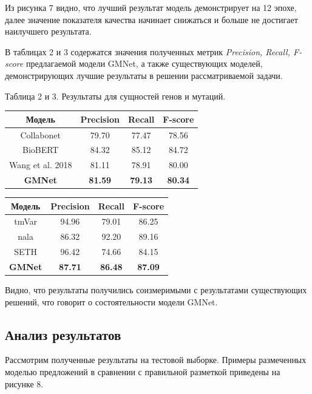 \documentclass[12pt, a4paper]{article} %
\begin{document}
Из рисунка 7 видно, что лучший результат модель демонстрирует на 12 эпохе, далее значение показателя качества начинает снижаться и больше не достигает наилучшего результата.

В таблицах 2 и 3 содержатся значения полученных метрик \textit{Precision, Recall, F-score} предлагаемой модели GMNet, а также существующих моделей, демонстрирующих лучшие результаты в решении рассматриваемой задачи.
 


\begin{center}
	\begin{table}[h]
		\centering
		Таблица 2 и 3. Результаты для сущностей генов и мутаций.
		\begin{tabular}{cccc}
			\hline Модель & Precision &  Recall & F-score \\
			\hline Collabonet & 79.70 & 77.47 & 78.56 \\
			BioBERT & 84.32 & 85.12 & 84.72 \\
			Wang et al. 2018 & 81.11 & 78.91 & 80.00 \\
			\hline
			\textbf{GMNet}&   \textbf{81.59}&   \textbf{79.13} & \textbf{80.34}   \\
			\hline 
		\end{tabular}
		\label{Tab:1}
	\end{table}
	
	\begin{table}[h]
		\centering
		\begin{tabular}{cccc}
			\hline Модель & Precision &  Recall & F-score \\
			\hline tmVar & 94.96 & 79.01 & 86.25 \\
			nala & 86.32 & 92.20 & 89.16 \\
			SETH & 96.42 & 74.66 & 84.15 \\
			\hline
			\textbf{GMNet} & \textbf{87.71}& \textbf{86.48} & \textbf{87.09}   \\
			\hline 
		\end{tabular}
		\label{Tab:3}
	\end{table}
\end{center}

Видно, что результаты получились соизмеримыми с результатами существующих решений, что говорит о состоятельности модели GMNet.

\subsection{Анализ результатов}
Рассмотрим полученные результаты на тестовой выборке. Примеры размеченных моделью предложений в сравнении с правильной разметкой приведены на рисунке 8.
\end{document}
